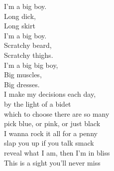 I'm a big boy. \\
Long dick, \\
Long skirt \\
I'm a big boy. \\
Scratchy beard, \\
Scratchy thighs. \\
I'm a big big boy, \\
Big muscles, \\
Big dresses. \\

I make my decisions each day, \\
by the light of a bidet \\
which to choose there are so many \\
pick blue, or pink, or just black \\
I wanna rock it all for a penny \\
slap you up if you talk smack \\
reveal what I am, then I'm in bliss \\
This is a sight you'll never miss \\

